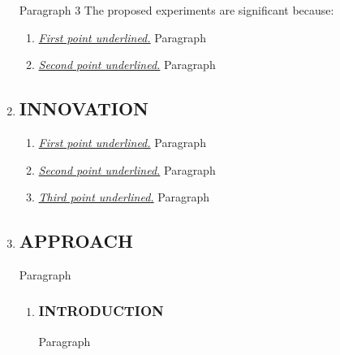 \documentclass[11pt]{article}
\begin{document}
\begin{enumerate}[wide, labelindent=0pt]
Paragraph 3
The proposed experiments are significant because:

    \begin{enumerate}[wide, labelindent=0pt, leftmargin=0pt]
        \item \textit{\uline{First point underlined.}} 
        Paragraph
        \item \textit{\uline{Second point underlined.}} 
        Paragraph\\
    \end{enumerate} 

\item \subsection*{INNOVATION} 
    
    \begin{enumerate}[wide, labelindent=0pt, leftmargin=0pt] 
        \item \textit{\uline{First point underlined.}} 
        Paragraph
        \item \textit{\uline{Second point underlined.}} 
        Paragraph
        \item \textit{\uline{Third point underlined.}} 
        Paragraph\\
    \end{enumerate} 
    
\item \subsection*{APPROACH} 

Paragraph\\

    \begin{enumerate}[wide, labelindent=0pt]

    \item \subsubsection*{INTRODUCTION}
        Paragraph


\end{enumerate}
\end{enumerate}
\end{document}
